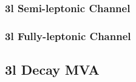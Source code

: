 \subsubsection{ 3l Semi-leptonic Channel}                                                                            
\label{subsec:pt3lS}                                                                                                    



 
\subsubsection{ 3l Fully-leptonic Channel}                                                                            
\label{subsec:pt3lF}                                                                                                    




\subsection{3l Decay MVA}
\label{subsec:decayMVA}



